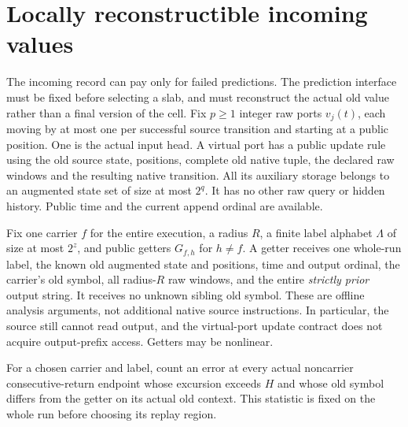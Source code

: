 \section{Locally reconstructible incoming values}\label{sec:getters}

The incoming record can pay only for failed predictions. The prediction
interface must be fixed before selecting a slab, and must reconstruct the
actual old value rather than a final version of the cell.
Fix $p\ge1$ integer raw ports $v_j(t)$, each moving by at most one per
successful source transition and starting at a public position. One is the
actual input head. A virtual port has a public update rule using the old
source state, positions, complete old native tuple, the declared raw windows
and the resulting native transition. All its auxiliary storage belongs to
an augmented state set of size at most $2^q$. It has no other raw query or
hidden history. Public time and the current append ordinal are available.

Fix one carrier $f$ for the entire execution, a radius $R$, a finite label
alphabet $\Lambda$ of size at most $2^z$, and public getters $G_{f,h}$ for
$h\ne f$. A getter receives one whole-run label, the known old augmented
state and positions, time and output ordinal, the carrier's old symbol,
all radius-$R$ raw windows, and the entire \emph{strictly prior} output
string. It receives no unknown sibling old symbol. These are offline
analysis arguments, not additional native source instructions. In particular,
the source still cannot read output, and the virtual-port update contract
does not acquire output-prefix access. Getters may be nonlinear.

For a chosen carrier and label, count an error at every actual noncarrier
consecutive-return endpoint whose excursion exceeds $H$ and whose old symbol
differs from the getter on its actual old context. This statistic is fixed
on the whole run before choosing its replay region.

